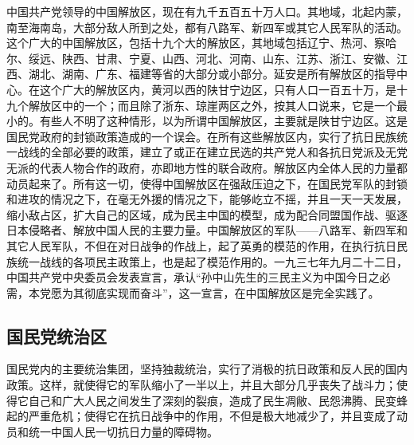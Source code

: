 中国共产党领导的中国解放区，现在有九千五百五十万人口。其地域，北起内蒙，南至海南岛，大部分敌人所到之处，都有八路军、新四军或其它人民军队的活动。这个广大的中国解放区，包括十九个大的解放区，其地域包括辽宁、热河、察哈尔、绥远、陕西、甘肃、宁夏、山西、河北、河南、山东、江苏、浙江、安徽、江西、湖北、湖南、广东、福建等省的大部分或小部分。延安是所有解放区的指导中心。在这个广大的解放区内，黄河以西的陕甘宁边区，只有人口一百五十万，是十九个解放区中的一个；而且除了浙东、琼崖两区之外，按其人口说来，它是一个最小的。有些人不明了这种情形，以为所谓中国解放区，主要就是陕甘宁边区。这是国民党政府的封锁政策造成的一个误会。在所有这些解放区内，实行了抗日民族统一战线的全部必要的政策，建立了或正在建立民选的共产党人和各抗日党派及无党无派的代表人物合作的政府，亦即地方性的联合政府。解放区内全体人民的力量都动员起来了。所有这一切，使得中国解放区在强敌压迫之下，在国民党军队的封锁和进攻的情况之下，在毫无外援的情况之下，能够屹立不摇，并且一天一天发展，缩小敌占区，扩大自己的区域，成为民主中国的模型，成为配合同盟国作战、驱逐日本侵略者、解放中国人民的主要力量。中国解放区的军队——八路军、新四军和其它人民军队，不但在对日战争的作战上，起了英勇的模范的作用，在执行抗日民族统一战线的各项民主政策上，也是起了模范作用的。一九三七年九月二十二日，中国共产党中央委员会发表宣言，承认“孙中山先生的三民主义为中国今日之必需，本党愿为其彻底实现而奋斗”，这一宣言，在中国解放区是完全实践了。

\subsection{国民党统治区}

国民党内的主要统治集团，坚持独裁统治，实行了消极的抗日政策和反人民的国内政策。这样，就使得它的军队缩小了一半以上，并且大部分几乎丧失了战斗力；使得它自己和广大人民之间发生了深刻的裂痕，造成了民生凋敝、民怨沸腾、民变蜂起的严重危机；使得它在抗日战争中的作用，不但是极大地减少了，并且变成了动员和统一中国人民一切抗日力量的障碍物。

